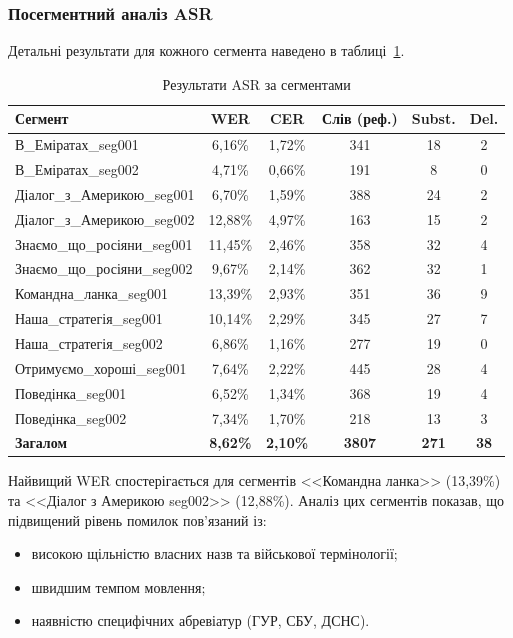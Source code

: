\subsubsection{Посегментний аналіз ASR}

Детальні результати для кожного сегмента наведено в таблиці~\ref{tab:asr_detailed}.

\begin{table}[H]
\centering
\caption{Результати ASR за сегментами}
\label{tab:asr_detailed}
\small
\begin{tabular}{|l|c|c|c|c|c|}
\hline
\textbf{Сегмент} & \textbf{WER} & \textbf{CER} & \textbf{Слів (реф.)} & \textbf{Subst.} & \textbf{Del.} \\
\hline
В\_Еміратах\_seg001 & 6,16\% & 1,72\% & 341 & 18 & 2 \\
В\_Еміратах\_seg002 & 4,71\% & 0,66\% & 191 & 8 & 0 \\
Діалог\_з\_Америкою\_seg001 & 6,70\% & 1,59\% & 388 & 24 & 2 \\
Діалог\_з\_Америкою\_seg002 & 12,88\% & 4,97\% & 163 & 15 & 2 \\
Знаємо\_що\_росіяни\_seg001 & 11,45\% & 2,46\% & 358 & 32 & 4 \\
Знаємо\_що\_росіяни\_seg002 & 9,67\% & 2,14\% & 362 & 32 & 1 \\
Командна\_ланка\_seg001 & 13,39\% & 2,93\% & 351 & 36 & 9 \\
Наша\_стратегія\_seg001 & 10,14\% & 2,29\% & 345 & 27 & 7 \\
Наша\_стратегія\_seg002 & 6,86\% & 1,16\% & 277 & 19 & 0 \\
Отримуємо\_хороші\_seg001 & 7,64\% & 2,22\% & 445 & 28 & 4 \\
Поведінка\_seg001 & 6,52\% & 1,34\% & 368 & 19 & 4 \\
Поведінка\_seg002 & 7,34\% & 1,70\% & 218 & 13 & 3 \\
\hline
\textbf{Загалом} & \textbf{8,62\%} & \textbf{2,10\%} & \textbf{3807} & \textbf{271} & \textbf{38} \\
\hline
\end{tabular}
\end{table}

Найвищий WER спостерігається для сегментів <<Командна ланка>> (13,39\%)
та <<Діалог з Америкою seg002>> (12,88\%). Аналіз цих сегментів показав,
що підвищений рівень помилок пов'язаний із:
\begin{itemize}
    \item високою щільністю власних назв та військової термінології;
    \item швидшим темпом мовлення;
    \item наявністю специфічних абревіатур (ГУР, СБУ, ДСНС).
\end{itemize}

